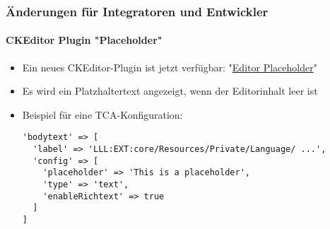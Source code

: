 %

\begin{frame}[fragile]
	\frametitle{Änderungen für Integratoren und Entwickler}
	\framesubtitle{CKEditor Plugin "Placeholder"}

	\lstset{basicstyle=\tiny\ttfamily}

	\begin{itemize}
		\item Ein neues CKEditor-Plugin ist jetzt verfügbar:
			"\href{https://ckeditor.com/docs/ckeditor4/latest/examples/editorplaceholder.html}{Editor Placeholder}"
		\item Es wird ein Platzhaltertext angezeigt, wenn der Editorinhalt leer ist
		\item Beispiel für eine TCA-Konfiguration:
\begin{lstlisting}
'bodytext' => [
  'label' => 'LLL:EXT:core/Resources/Private/Language/ ...',
  'config' => [
    'placeholder' => 'This is a placeholder',
    'type' => 'text',
    'enableRichtext' => true
  ]
]
\end{lstlisting}

	\end{itemize}

\end{frame}

